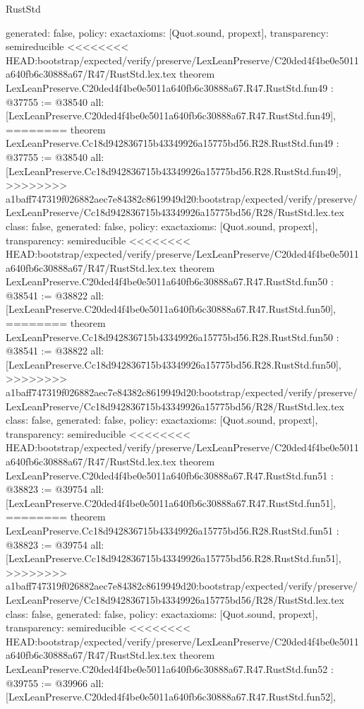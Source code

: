 \begin{lexlean}{RustStd}
\begin{coremodule}
{\begin{coremodule}
{{{{{{{{{{{{{{{{{{{{{{{{{{{{{{{{{{{{{{{{{{{{{{{{{{{{  generated: false,
  policy: exact{axioms: [Quot.sound, propext]},
  transparency: semireducible
}
<<<<<<<< HEAD:bootstrap/expected/verify/preserve/LexLeanPreserve/C20ded4f4be0e5011a640fb6c30888a67/R47/RustStd.lex.tex
theorem LexLeanPreserve.C20ded4f4be0e5011a640fb6c30888a67.R47.RustStd.fun49 : @37755 := @38540 {
  all: [LexLeanPreserve.C20ded4f4be0e5011a640fb6c30888a67.R47.RustStd.fun49],
========
theorem LexLeanPreserve.Cc18d942836715b43349926a15775bd56.R28.RustStd.fun49 : @37755 := @38540 {
  all: [LexLeanPreserve.Cc18d942836715b43349926a15775bd56.R28.RustStd.fun49],
>>>>>>>> a1baff747319f026882aec7e84382c8619949d20:bootstrap/expected/verify/preserve/LexLeanPreserve/Cc18d942836715b43349926a15775bd56/R28/RustStd.lex.tex
  class: false,
  generated: false,
  policy: exact{axioms: [Quot.sound, propext]},
  transparency: semireducible
}
<<<<<<<< HEAD:bootstrap/expected/verify/preserve/LexLeanPreserve/C20ded4f4be0e5011a640fb6c30888a67/R47/RustStd.lex.tex
theorem LexLeanPreserve.C20ded4f4be0e5011a640fb6c30888a67.R47.RustStd.fun50 : @38541 := @38822 {
  all: [LexLeanPreserve.C20ded4f4be0e5011a640fb6c30888a67.R47.RustStd.fun50],
========
theorem LexLeanPreserve.Cc18d942836715b43349926a15775bd56.R28.RustStd.fun50 : @38541 := @38822 {
  all: [LexLeanPreserve.Cc18d942836715b43349926a15775bd56.R28.RustStd.fun50],
>>>>>>>> a1baff747319f026882aec7e84382c8619949d20:bootstrap/expected/verify/preserve/LexLeanPreserve/Cc18d942836715b43349926a15775bd56/R28/RustStd.lex.tex
  class: false,
  generated: false,
  policy: exact{axioms: [Quot.sound, propext]},
  transparency: semireducible
}
<<<<<<<< HEAD:bootstrap/expected/verify/preserve/LexLeanPreserve/C20ded4f4be0e5011a640fb6c30888a67/R47/RustStd.lex.tex
theorem LexLeanPreserve.C20ded4f4be0e5011a640fb6c30888a67.R47.RustStd.fun51 : @38823 := @39754 {
  all: [LexLeanPreserve.C20ded4f4be0e5011a640fb6c30888a67.R47.RustStd.fun51],
========
theorem LexLeanPreserve.Cc18d942836715b43349926a15775bd56.R28.RustStd.fun51 : @38823 := @39754 {
  all: [LexLeanPreserve.Cc18d942836715b43349926a15775bd56.R28.RustStd.fun51],
>>>>>>>> a1baff747319f026882aec7e84382c8619949d20:bootstrap/expected/verify/preserve/LexLeanPreserve/Cc18d942836715b43349926a15775bd56/R28/RustStd.lex.tex
  class: false,
  generated: false,
  policy: exact{axioms: [Quot.sound, propext]},
  transparency: semireducible
}
<<<<<<<< HEAD:bootstrap/expected/verify/preserve/LexLeanPreserve/C20ded4f4be0e5011a640fb6c30888a67/R47/RustStd.lex.tex
theorem LexLeanPreserve.C20ded4f4be0e5011a640fb6c30888a67.R47.RustStd.fun52 : @39755 := @39966 {
  all: [LexLeanPreserve.C20ded4f4be0e5011a640fb6c30888a67.R47.RustStd.fun52],
}}}}}}}}}}}}}}}}}}}}}}}}}}}}}}}}}}}}}}}}}}}}}}}}}}}}}}}
\end{coremodule}}
\end{coremodule}
\end{lexlean}
